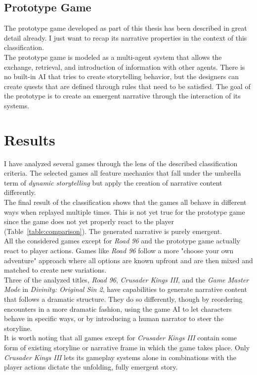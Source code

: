 \subsection{Prototype Game}
The prototype game developed as part of this thesis has been described in great detail already. I just want to recap its narrative properties in the context of this classification.\\
The prototype game is modeled as a multi-agent system that allows the exchange, retrieval, and introduction of information with other agents. There is no built-in AI that tries to create storytelling behavior, but the designers can create quests that are defined through rules that need to be satisfied. The goal of the prototype is to create an emergent narrative through the interaction of its systems.
\section{Results}
I have analyzed several games through the lens of the described classification criteria. The selected games all feature mechanics that fall under the umbrella term of \textit{dynamic storytelling} but apply the creation of narrative content differently.\\
The final result of the classification shows that the games all behave in different ways when replayed multiple times. This is not yet true for the prototype game since the game does not yet properly react to the player (Table~\ref{table:comparison}). The generated narrative is purely emergent.\\
All the considered games except for \textit{Road 96} and the prototype game actually react to player actions. Games like \textit{Road 96} follow a more "choose your own adventure" approach where all options are known upfront and are then mixed and matched to create new variations.\\
Three of the analyzed titles, \textit{Road 96}, \textit{Crusader Kings III}, and the \textit{Game Master Mode} in \textit{Divinity: Original Sin 2}, have capabilities to generate narrative content that follows a dramatic structure. They do so differently, though by reordering encounters in a more dramatic fashion, using the game AI to let characters behave in specific ways, or by introducing a human narrator to steer the storyline.\\
It is worth noting that all games except for \textit{Crusader Kings III} contain some form of existing storyline or narrative frame in which the game takes place. Only \textit{Crusader Kings III} lets its gameplay systems alone in combinations with the player actions dictate the unfolding, fully emergent story. 
